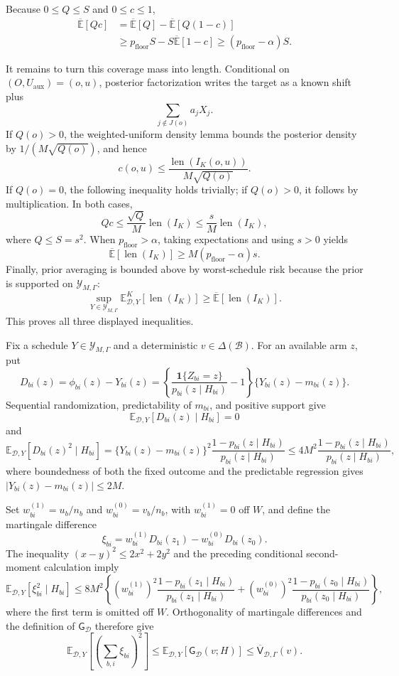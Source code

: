 Because \(0\le Q\le S\) and \(0\le c\le1\),
\[
 \begin{aligned}
 \overline{\mathbb E}[Qc]
 &=\overline{\mathbb E}[Q]
   -\overline{\mathbb E}[Q(1-c)] \\
 &\ge p_{\mathrm{floor}}S-S\overline{\mathbb E}[1-c]
 \ge(p_{\mathrm{floor}}-\alpha)S.
 \end{aligned}
\]

It remains to turn this coverage mass into length.  Conditional on \((O,U_{\mathrm{aux}})=(o,u)\), posterior factorization writes the target as a known shift plus
\[
 \sum_{j\notin J(o)}a_jX_j.
\]
If \(Q(o)>0\), the weighted-uniform density lemma bounds the posterior density by \(1/(M\sqrt{Q(o)})\), and hence
\[
 c(o,u)\le\frac{\operatorname{len}(I_K(o,u))}{M\sqrt{Q(o)}}.
\]
If \(Q(o)=0\), the following inequality holds trivially; if \(Q(o)>0\), it follows by multiplication.  In both cases,
\[
 Qc\le\frac{\sqrt Q}{M}\operatorname{len}(I_K)
 \le\frac{s}{M}\operatorname{len}(I_K),
\]
where \(Q\le S=s^2\).  When \(p_{\mathrm{floor}}>\alpha\), taking expectations and using \(s>0\) yields
\[
 \overline{\mathbb E}[\operatorname{len}(I_K)]
 \ge M(p_{\mathrm{floor}}-\alpha)s.
\]
Finally, prior averaging is bounded above by worst-schedule risk because the prior is supported on \(\mathcal Y_{M,\Gamma}\):
\[
 \sup_{Y\in\mathcal Y_{M,\Gamma}}
 \mathbb E^K_{\mathcal D,Y}[\operatorname{len}(I_K)]
 \ge \overline{\mathbb E}[\operatorname{len}(I_K)].
\]
This proves all three displayed inequalities.

Fix a schedule \(Y\in\mathcal Y_{M,\Gamma}\) and a deterministic \(v\in\Delta(\mathcal B)\).  For an available arm \(z\), put
\[
 D_{bi}(z)=\phi_{bi}(z)-Y_{bi}(z)
 =\left\{\frac{\mathbf 1\{Z_{bi}=z\}}{p_{bi}(z\mid H_{bi})}-1\right\}
   \{Y_{bi}(z)-m_{bi}(z)\}.
\]
Sequential randomization, predictability of \(m_{bi}\), and positive support give
\[
 \mathbb E_{\mathcal D,Y}[D_{bi}(z)\mid H_{bi}]=0
\]
and
\[
 \mathbb E_{\mathcal D,Y}[D_{bi}(z)^2\mid H_{bi}]
 =\{Y_{bi}(z)-m_{bi}(z)\}^2
   \frac{1-p_{bi}(z\mid H_{bi})}{p_{bi}(z\mid H_{bi})}
 \le4M^2\frac{1-p_{bi}(z\mid H_{bi})}{p_{bi}(z\mid H_{bi})},
\]
where boundedness of both the fixed outcome and the predictable regression gives \(|Y_{bi}(z)-m_{bi}(z)|\le2M\).

Set \(w^{(1)}_{bi}=u_b/n_b\) and \(w^{(0)}_{bi}=v_b/n_b\), with \(w^{(1)}_{bi}=0\) off \(W\), and define the martingale difference
\[
 \xi_{bi}=w^{(1)}_{bi}D_{bi}(z_1)-w^{(0)}_{bi}D_{bi}(z_0).
\]
The inequality \((x-y)^2\le2x^2+2y^2\) and the preceding conditional second-moment calculation imply
\[
 \mathbb E_{\mathcal D,Y}[\xi_{bi}^2\mid H_{bi}]
 \le8M^2\left\{(w^{(1)}_{bi})^2
 \frac{1-p_{bi}(z_1\mid H_{bi})}{p_{bi}(z_1\mid H_{bi})}
 +(w^{(0)}_{bi})^2
 \frac{1-p_{bi}(z_0\mid H_{bi})}{p_{bi}(z_0\mid H_{bi})}\right\},
\]
where the first term is omitted off \(W\).  Orthogonality of martingale differences and the definition of \(\mathsf G_{\mathcal D}\) therefore give
\[
 \mathbb E_{\mathcal D,Y}\left[\left(\sum_{b,i}\xi_{bi}\right)^2\right]
 \le \mathbb E_{\mathcal D,Y}[\mathsf G_{\mathcal D}(v;H)]
 \le\overline{\mathsf V}_{\mathcal D,\Gamma}(v).
\]


